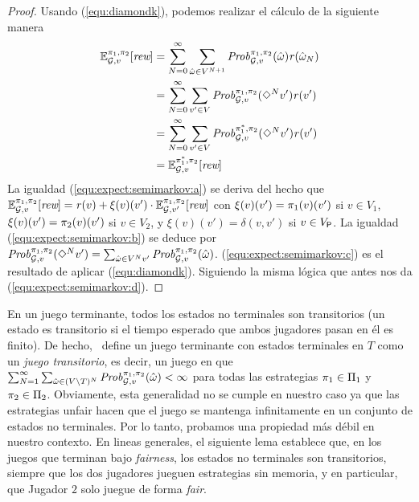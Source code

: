 \begin{proof}
  Usando (\ref{equ:diamondk}), podemos realizar el cálculo de la siguiente manera
  \begin{align}
  \mathbb{E}^{\pi_{1}, \pi_{2}}_{\mathcal{G},v}[\textit{rew}]   &  = \sum^\infty_{N=0} \sum_{\hat{\omega} \in V^{N+1}} \mathit{Prob}^{\pi_{1}, \pi_{2}}_{\mathcal{G},v}(\hat{\omega})\mathit{r}(\hat{\omega}_N) \label{equ:expect:semimarkov:a}\\
  & = \sum^\infty_{N=0} \sum_{v' \in V} \mathit{Prob}^{\pi_{1}, \pi_{2}}_{\mathcal{G},v}(\Diamond^N v')\mathit{r}(v') \label{equ:expect:semimarkov:b}\\
  & =  \sum^\infty_{N=0} \sum_{v' \in V} \mathit{Prob}^{\pi^*_{1}, \pi_{2}}_{\mathcal{G},v}(\Diamond^N v')\mathit{r}(v') \label{equ:expect:semimarkov:c}\\
  &  = \mathbb{E}^{\pi^*_{1}, \pi_{2}}_{\mathcal{G},v}[\textit{rew}] \label{equ:expect:semimarkov:d}
  \end{align}
  La igualdad (\ref{equ:expect:semimarkov:a}) se deriva del hecho que 
  $\mathbb{E}^{\pi_{1}, \pi_{2}}_{\mathcal{G},v}[\textit{rew}]= \mathit{r}(v) + \xi(v)(v') \cdot \mathbb{E}^{\pi_{1}, \pi_{2}}_{\mathcal{G},v'}[\textit{rew}]$
  con $\xi(v)(v')=\pi_{1}(v)(v')$ si $v\in V_1$,
  $\xi(v)(v')=\pi_{2}(v)(v')$ si $v\in V_2$, y $\xi(v)(v')=\delta(v,v')$
  si $v\in V_{\mathsf{P}}$.
  La igualdad (\ref{equ:expect:semimarkov:b}) se deduce por
  $\mathit{Prob}^{\pi_{1}, \pi_{2}}_{\mathcal{G},v}(\Diamond^N v')=\sum_{\hat{\omega} \in V^{N}v'} \mathit{Prob}^{\pi_{1}, \pi_{2}}_{\mathcal{G},v}(\hat{\omega})$.
  (\ref{equ:expect:semimarkov:c}) es el resultado de aplicar
  (\ref{equ:diamondk}).
  Siguiendo la misma lógica que antes nos da (\ref{equ:expect:semimarkov:d}).
\qedhere
\end{proof}
\fi
%


En un juego terminante, todos los estados no terminales son transitorios (un estado es
transitorio si el tiempo esperado que ambos jugadores pasan en él es
finito). De hecho, \cite{FilarV96}~define un juego terminante con
estados terminales en $T$ como un \emph{juego transitorio}, es decir, un juego en
que $\sum^\infty_{N=1} \sum_{\hat{\omega} \in (V \setminus T)^{N}}
\mathit{Prob}^{\pi_{1}, \pi_{2}}_{\mathcal{G},v}(\hat{\omega}) < \infty$ para
todas las estrategias $\pi_{1}\in\Pi_{1}$ y $\pi_{2}\in\Pi_{2}$.
%
Obviamente, esta generalidad no se cumple en nuestro caso ya que las
estrategias unfair hacen que el juego se mantenga infinitamente en un conjunto de estados no terminales.
%
Por lo tanto, probamos una propiedad más débil en nuestro contexto. En lineas generales,
el siguiente lema establece que, en los juegos que terminan bajo \textit{fairness},
los estados no terminales son transitorios, siempre que los dos jugadores jueguen
estrategias sin memoria, y en particular, que Jugador $2$ solo juegue de forma
\textit{fair}.

